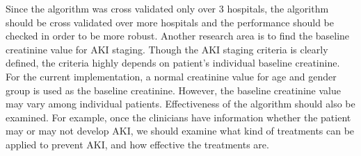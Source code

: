 \documentclass[
   technote
]{phildoc}
\begin{document}
Since the algorithm was cross validated only over 3 hospitals, the algorithm should be cross validated over more hospitals and the performance should be checked in order to be more robust. Another research area is to find the baseline creatinine value for AKI staging. Though the AKI staging criteria is clearly defined, the criteria highly depends on patient's individual baseline creatinine. For the current implementation, a normal creatinine value for age and gender group is used as the baseline creatinine. However, the baseline creatinine value may vary among individual patients. Effectiveness of the algorithm should also be examined. For example, once the clinicians have information whether the patient may or may not develop AKI, we should examine what kind of treatments can be applied to prevent AKI, and how effective the treatments are.




\end{document}
